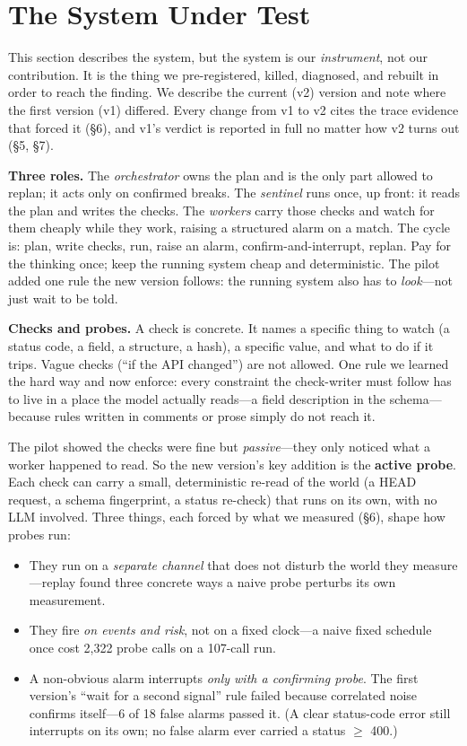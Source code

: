 \documentclass[acmsmall,screen]{acmart}
\begin{document}
\section{The System Under Test}
This section describes the system, but the system is our \emph{instrument}, not
our contribution. It is the thing we pre-registered, killed, diagnosed, and
rebuilt in order to reach the finding. We describe the current (v2) version and
note where the first version (v1) differed. Every change from v1 to v2 cites
the trace evidence that forced it (\S6), and v1's verdict is reported in full
no matter how v2 turns out (\S5, \S7).

\textbf{Three roles.} The \emph{orchestrator} owns the plan and is the only
part allowed to replan; it acts only on confirmed breaks. The \emph{sentinel}
runs once, up front: it reads the plan and writes the checks. The \emph{workers}
carry those checks and watch for them cheaply while they work, raising a
structured alarm on a match. The cycle is: plan, write checks, run, raise an
alarm, confirm-and-interrupt, replan. Pay for the thinking once; keep the
running system cheap and deterministic. The pilot added one rule the new
version follows: the running system also has to \emph{look}---not just wait to
be told.

\textbf{Checks and probes.} A check is concrete. It names a specific thing to
watch (a status code, a field, a structure, a hash), a specific value, and what
to do if it trips. Vague checks (``if the API changed'') are not allowed. One
rule we learned the hard way and now enforce: every constraint the check-writer
must follow has to live in a place the model actually reads---a field
description in the schema---because rules written in comments or prose simply do
not reach it.

The pilot showed the checks were fine but \emph{passive}---they only noticed
what a worker happened to read. So the new version's key addition is the
\textbf{active probe}. Each check can carry a small, deterministic re-read of
the world (a HEAD request, a schema fingerprint, a status re-check) that runs on
its own, with no LLM involved. Three things, each forced by what we measured
(\S6), shape how probes run:

\begin{itemize}
  \item They run on a \emph{separate channel} that does not disturb the world
  they measure---replay found three concrete ways a naive probe perturbs its
  own measurement.
  \item They fire \emph{on events and risk}, not on a fixed clock---a naive
  fixed schedule once cost 2,322 probe calls on a 107-call run.
  \item A non-obvious alarm interrupts \emph{only with a confirming probe}. The
  first version's ``wait for a second signal'' rule failed because correlated
  noise confirms itself---6 of 18 false alarms passed it. (A clear status-code
  error still interrupts on its own; no false alarm ever carried a status
  $\ge$ 400.)
\end{itemize}
\end{document}
